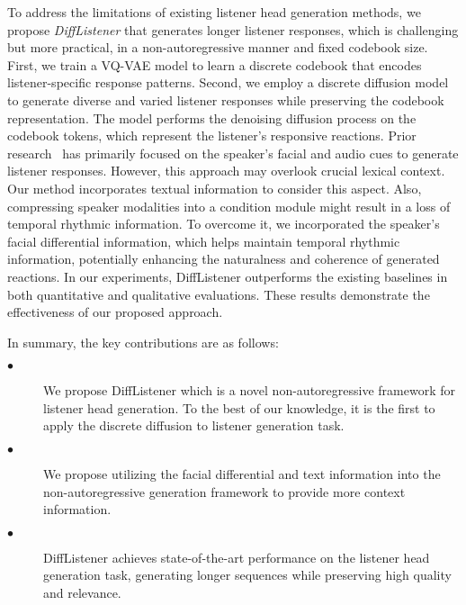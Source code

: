 To address the limitations of existing listener head generation methods, we propose \emph{DiffListener} that generates longer listener responses, which is challenging but more practical, in a non-autoregressive manner and fixed codebook size. 
First, we train a VQ-VAE\cite{van2017neural} model to learn a discrete codebook that encodes listener-specific response patterns. Second, we employ a discrete diffusion model~\cite{gu2022vector} to generate diverse and varied listener responses while preserving the codebook representation. 
The model performs the denoising diffusion process on the codebook tokens, which represent the listener's responsive reactions.
Prior research~\cite {ng2022learning,zhou2022responsive,song2023emotional} has primarily focused on the speaker's facial and audio cues to generate listener responses. 
However, this approach may overlook crucial lexical context. 
Our method incorporates textual information to consider this aspect.
Also, compressing speaker modalities into a condition module might result in a loss of temporal rhythmic information.
To overcome it, we incorporated the speaker's facial differential information, which helps maintain temporal rhythmic information, potentially enhancing the naturalness and coherence of generated reactions.
In our experiments, DiffListener outperforms the existing baselines in both quantitative and qualitative evaluations. These results demonstrate the effectiveness of our proposed approach.

In summary, the key contributions are as follows:
\begin{description}
    \item[$\bullet$] We propose DiffListener which is a novel non-autoregressive framework for listener head generation.
    To the best of our knowledge, it is the first to apply the discrete diffusion to listener generation task.
    \item[$\bullet$]
    We propose utilizing the facial differential and text information
    into the non-autoregressive generation framework to provide more context information.
    \item[$\bullet$] DiffListener achieves state-of-the-art performance on the listener head generation task, generating longer sequences while preserving high quality and relevance. 
\end{description}
